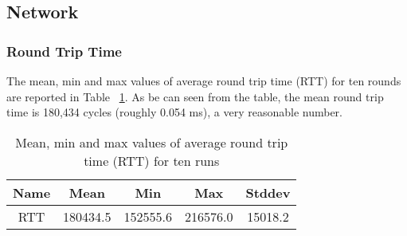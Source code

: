 \subsection{Network}
\subsubsection{Round Trip Time}
The mean, min and max values of average round trip time (RTT) for ten rounds are reported in Table ~\ref{tab:t7}. 
As be can seen from the table, the mean round trip time is 180,434 cycles (roughly 0.054 ms),
 a very reasonable number.
\begin{table}[htb]
\caption{Mean, min and max values of average round trip time (RTT) for ten runs}    
\begin{tabular}{|c|c|c|c|c|} 
    \hline
    Name & Mean & Min & Max & Stddev\\ 
    \hline
    RTT & 180434.5 & 152555.6 & 216576.0 & 15018.2\\
    \hline
   \end{tabular}
\label{tab:t7}
\end{table}